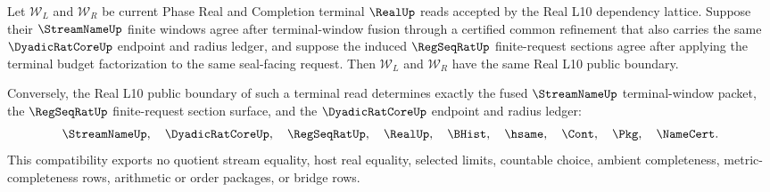 \begin{theorem}
\label{thm:real-l10-terminal-window-fusion-section-compatibility}
Let $\mathcal W_L$ and $\mathcal W_R$ be current Phase Real and Completion terminal $\RealUp$ reads accepted by the Real L10 dependency lattice. Suppose their $\StreamNameUp$ finite windows agree after terminal-window fusion through a certified common refinement that also carries the same $\DyadicRatCoreUp$ endpoint and radius ledger, and suppose the induced $\RegSeqRatUp$ finite-request sections agree after applying the terminal budget factorization to the same seal-facing request. Then $\mathcal W_L$ and $\mathcal W_R$ have the same Real L10 public boundary.

Conversely, the Real L10 public boundary of such a terminal read determines exactly the fused $\StreamNameUp$ terminal-window packet, the $\RegSeqRatUp$ finite-request section surface, and the $\DyadicRatCoreUp$ endpoint and radius ledger:
$$
\StreamNameUp,\quad \DyadicRatCoreUp,\quad \RegSeqRatUp,\quad \RealUp,\quad
\BHist,\quad \hsame,\quad \Cont,\quad \Pkg,\quad \NameCert.
$$
This compatibility exports no quotient stream equality, host real equality, selected limits, countable choice, ambient completeness, metric-completeness rows, arithmetic or order packages, or bridge rows.
\end{theorem}
